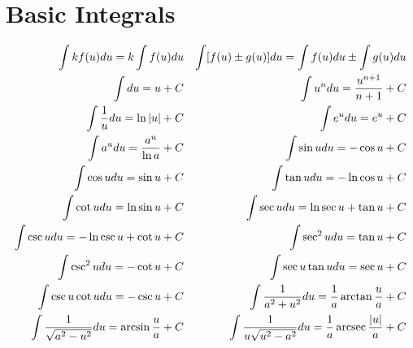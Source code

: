\section{Basic Integrals}
\begin{align*}
  \int kf(u) du = k\int f(u) du &&
  \int [f(u) \pm g(u)] du = \int f(u) du \pm \int g(u) du \\
  \int du = u + C &&
  \int u^n du = \frac{u^{n+1}}{n+1} + C \\
  \int \frac{1}{u} du = \ln{|u|} + C &&
  \int e^u du = e^u + C \\
  \int a^u du = \frac{a^u}{\ln{a}} + C &&
  \int \sin{u} du = -\cos{u} + C \\
  \int \cos{u} du = \sin{u} + C &&
  \int \tan{u} du = -\ln{\cos{u}} + C \\
  \int \cot{u} du = \ln{\sin{u}} + C &&
  \int \sec{u} du = \ln{\sec{u}+\tan{u}} + C \\
  \int \csc{u} du = -\ln{\csc{u}+\cot{u}} + C &&
  \int \sec^2{u} du = \tan{u} + C \\
  \int \csc^2{u} du = -\cot{u} + C &&
  \int \sec{u}\tan{u} du = \sec{u} + C \\
  \int \csc{u}\cot{u} du = -\csc{u} + C &&
  \int \frac{1}{a^2+u^2} du = \frac{1}{a}\arctan{\frac{u}{a}} + C \\
  \int \frac{1}{\sqrt{a^2-u^2}} du = \arcsin{\frac{u}{a}} + C &&
  \int \frac{1}{u\sqrt{u^2-a^2}} du = \frac{1}{a}\operatorname{arcsec}{\frac{|u|}{a}} + C
\end{align*}
